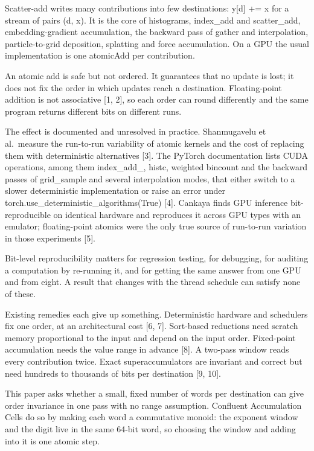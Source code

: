 \documentclass[3p,10pt]{elsarticle}
\begin{document}
Scatter-add writes many contributions into few destinations: y{[}d{]} +=
x for a stream of pairs (d, x). It is the core of histograms, index\_add
and scatter\_add, embedding-gradient accumulation, the backward pass of
gather and interpolation, particle-to-grid deposition, splatting and
force accumulation. On a GPU the usual implementation is one atomicAdd
per contribution.

An atomic add is safe but not ordered. It guarantees that no update is
lost; it does not fix the order in which updates reach a destination.
Floating-point addition is not associative {[}1, 2{]}, so each order can
round differently and the same program returns different bits on
different runs.

The effect is documented and unresolved in practice. Shanmugavelu et
al.~measure the run-to-run variability of atomic kernels and the cost of
replacing them with deterministic alternatives {[}3{]}. The PyTorch
documentation lists CUDA operations, among them index\_add\_, histc,
weighted bincount and the backward passes of grid\_sample and several
interpolation modes, that either switch to a slower deterministic
implementation or raise an error under
torch.use\_deterministic\_algorithms(True) {[}4{]}. Cankaya finds GPU
inference bit-reproducible on identical hardware and reproduces it
across GPU types with an emulator; floating-point atomics were the only
true source of run-to-run variation in those experiments {[}5{]}.

Bit-level reproducibility matters for regression testing, for debugging,
for auditing a computation by re-running it, and for getting the same
answer from one GPU and from eight. A result that changes with the
thread schedule can satisfy none of these.

Existing remedies each give up something. Deterministic hardware and
schedulers fix one order, at an architectural cost {[}6, 7{]}.
Sort-based reductions need scratch memory proportional to the input and
depend on the input order. Fixed-point accumulation needs the value
range in advance {[}8{]}. A two-pass window reads every contribution
twice. Exact superaccumulators are invariant and correct but need
hundreds to thousands of bits per destination {[}9, 10{]}.

This paper asks whether a small, fixed number of words per destination
can give order invariance in one pass with no range assumption.
Confluent Accumulation Cells do so by making each word a commutative
monoid: the exponent window and the digit live in the same 64-bit word,
so choosing the window and adding into it is one atomic step.
\end{document}
